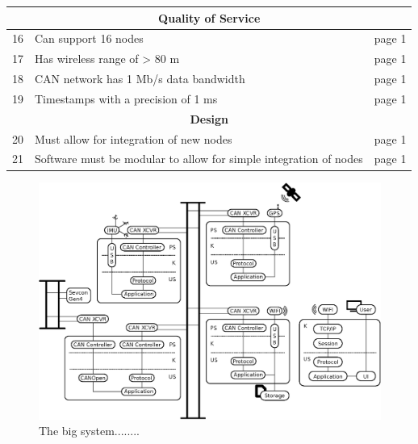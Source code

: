 \begin{table}[h]
\begin{tabular}{ |p{0.3cm}|p{8.5cm}|p{1cm}| }
\hline
\multicolumn{3}{|c|}{\textbf{Quality of Service}}\\
\hline	
16 & Can support 16 nodes							 	& page 1 \\
17 & Has wireless range of > 80 m						 	& page 1 \\
18 & CAN network has 1 Mb/s data bandwidth			 	& page 1 \\
19 & Timestamps with a precision of 1 ms 			 	& page 1 \\

\hline
\multicolumn{3}{|c|}{\textbf{Design}}\\
\hline	
20 & Must allow for integration of new nodes		 					& page 1 \\
21 & Software must be modular to allow for simple integration of nodes	& page 1 \\

\hline
\end{tabular}
\end{table}

\newpage
\begin{figure}[!h]
	\centering
	\includegraphics[angle=90,width=\textwidth]{graphics/analysis_complex.eps}
	\caption{The big system........}
	\label{fig:complete_system}
\end{figure}



